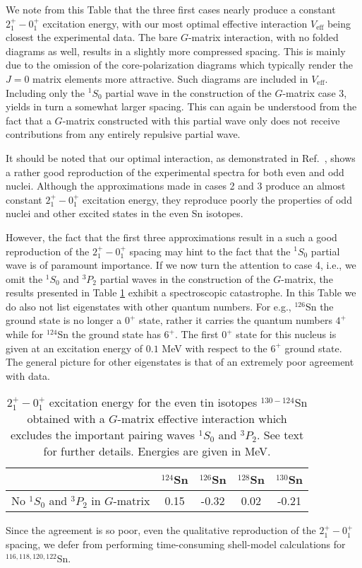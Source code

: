 \documentclass{ws-p9-75x6-50}
\begin{document}
We note from this Table that the three first cases nearly produce a constant 
$2^+_1-0^+_1$ excitation energy, with our most optimal effective interaction
$V_{\mathrm{eff}}$ being closest the experimental data. The bare $G$-matrix
interaction, with no folded diagrams as well, results in a slightly more compressed
spacing. This is mainly due to the omission of the core-polarization 
diagrams which typically render the $J=0$ matrix elements more attractive.
Such diagrams are included in $V_{\mathrm{eff}}$. 
Including only the $^1S_0$ partial wave in the construction of the  $G$-matrix
case 3,
yields in turn a somewhat larger spacing. This can again be understood from the
fact that a $G$-matrix constructed with this partial wave  
only does not receive contributions from any entirely repulsive partial wave.

It should be noted that our optimal interaction, as demonstrated in 
Ref.\ \cite{ehho97}, shows a rather good reproduction of the 
experimental spectra for both even and odd nuclei. Although the approximations
made in cases 2 and 3 produce an almost constant $2^+_1-0^+_1$ excitation energy,
they reproduce poorly the properties of odd nuclei and other 
excited states in the even Sn isotopes. 

However, the fact that the first three  approximations result in a such a good
reproduction of the  $2^+_1-0^+_1$ spacing may hint to the fact that the 
$^1S_0$ partial wave is of paramount importance. 
If we now turn the attention to case 4, i.e., we omit the
$^1S_0$ and $^3P_2$ partial waves in the construction of the $G$-matrix,
the results presented  in Table \ref{tab:table2} exhibit  a spectroscopic 
catastrophe. In this Table we do also not list eigenstates
with other quantum numbers. For e.g., $^{126}$Sn
the ground state is no longer a $0^+$ state, rather it carries the quantum numbers
$4^+$ while for $^{124}$Sn the ground state 
has $6^+$. The first $0^+$ state for this nucleus is given at an excitation
energy of $0.1$ MeV with respect to the $6^+$ ground state.
The general picture for other eigenstates is that of an extremely poor agreement
with data.  
\begin{table}[t]
\begin{center}
\caption{ $2^+_1-0^+_1$ excitation energy for the 
even tin isotopes $^{130-124}$Sn obtained with a $G$-matrix
effective interaction which excludes the important
pairing waves $^1S_0$ and $^3P_2$. See text for further details. 
Energies are given in MeV. }
\begin{tabular}{lcccc}\hline
& {$^{124}$Sn} & {$^{126}$Sn} & {$^{128}$Sn} & {$^{130}$Sn} \\ \hline
No $^1S_0$ and $^3P_2$ in $G$-matrix &0.15  &-0.32  &0.02 &-0.21  \\\hline
\end{tabular}
\end{center}
\label{tab:table2}
\end{table}
Since the agreement is so poor, even the qualitative reproduction of the 
$2^+_1-0^+_1$ spacing, we defer from performing time-consuming shell-model
calculations for $^{116,118,120,122}$Sn.
\end{document}
